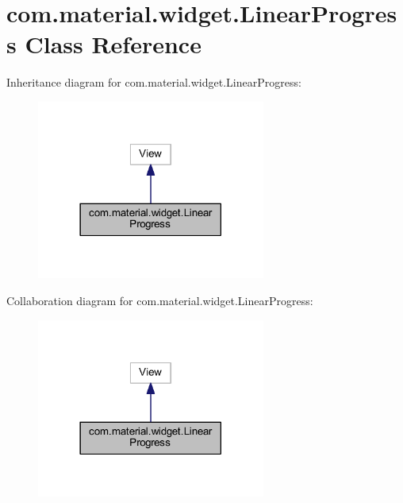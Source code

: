 \hypertarget{classcom_1_1material_1_1widget_1_1_linear_progress}{}\section{com.\+material.\+widget.\+Linear\+Progress Class Reference}
\label{classcom_1_1material_1_1widget_1_1_linear_progress}


Inheritance diagram for com.\+material.\+widget.\+Linear\+Progress\+:
\nopagebreak
\begin{figure}[H]
\begin{center}
\leavevmode
\includegraphics[width=213pt]{classcom_1_1material_1_1widget_1_1_linear_progress__inherit__graph}
\end{center}
\end{figure}


Collaboration diagram for com.\+material.\+widget.\+Linear\+Progress\+:
\nopagebreak
\begin{figure}[H]
\begin{center}
\leavevmode
\includegraphics[width=213pt]{classcom_1_1material_1_1widget_1_1_linear_progress__coll__graph}
\end{center}
\end{figure}
